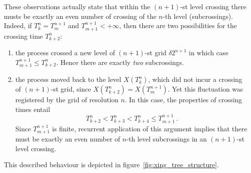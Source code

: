 These observations actually state that within the $(n+1)$-st level crossing there musts
be exactly an even number of crossing of the $n$-th level (subcrossings). Indeed,
if $T_k^n = T_m^{n+1}$ and $T_{m+1}^{n+1}<+\infty$, then there are two possibilities
for the crossing time $T_{k+2}^n$: \begin{enumerate}
	\item the process crossed a new level of $(n+1)$-st grid $\delta 2^{n+1}$ in which
	case $T_{m+1}^{n+1}\leq T_{k+2}^n$. Hence there are exactly \emph{two} subcrossings.
	\item the process moved back to the level $X(T_k^n)$, which did not incur a crossing
	of $(n+1)$-st grid, since $X(T_{k+2}^n)=X(T_m^{n+1})$. Yet this fluctuation was
	registered by the grid of resolution $n$. In this case, the properties of crossing
	times entail \[ T_{k+2}^n < T_{k+3}^n < T_{k+4}^n \leq T_{m+1}^{n+1} \,. \]
	Since $T_{m+1}^{n+1}$ is finite, recurrent application of this argument implies that
	there must be exactly an even number of $n$-th level subcrossings in an $(n+1)$-st
	level crossing.
\end{enumerate}
This described behaviour is depicted in figure~\ref{fig:xing_tree_structure}.

